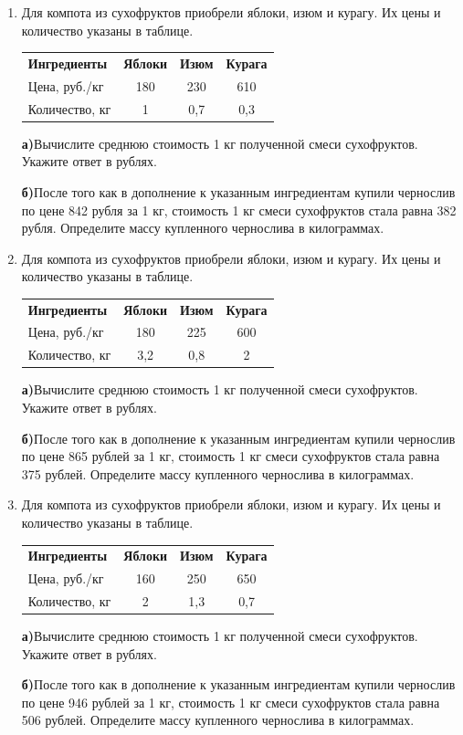 \documentclass[a4paper,12pt]{article}
\newcommand{\taskspace}{\par\vspace{0.42cm}}
\newcommand{\subtask}[2]{\par\medskip\textbf{#1}\enspace #2\par\vspace{0.22cm}}
\begin{document}
\begin{enumerate}[resume]
\taskspace

\item Для компота из сухофруктов приобрели яблоки, изюм и курагу. Их цены и количество указаны в таблице.
\begin{center}
\renewcommand{\arraystretch}{1.22}
\begin{tabular}{@{}lccc@{}}\textbf{Ингредиенты} & \textbf{Яблоки} & \textbf{Изюм} & \textbf{Курага} \\
Цена, руб./кг & 180 & 230 & 610 \\
Количество, кг & 1 & 0,7 & 0,3\end{tabular}
\end{center}
\subtask{а)}{Вычислите среднюю стоимость 1 кг полученной смеси сухофруктов. Укажите ответ в рублях.}
\subtask{б)}{После того как в дополнение к указанным ингредиентам купили чернослив по цене 842 рубля за 1 кг, стоимость 1 кг смеси сухофруктов стала равна 382 рубля. Определите массу купленного чернослива в килограммах.}

\taskspace

\item Для компота из сухофруктов приобрели яблоки, изюм и курагу. Их цены и количество указаны в таблице.
\begin{center}
\renewcommand{\arraystretch}{1.22}
\begin{tabular}{@{}lccc@{}}\textbf{Ингредиенты} & \textbf{Яблоки} & \textbf{Изюм} & \textbf{Курага} \\
Цена, руб./кг & 180 & 225 & 600 \\
Количество, кг & 3,2 & 0,8 & 2\end{tabular}
\end{center}
\subtask{а)}{Вычислите среднюю стоимость 1 кг полученной смеси сухофруктов. Укажите ответ в рублях.}
\subtask{б)}{После того как в дополнение к указанным ингредиентам купили чернослив по цене 865 рублей за 1 кг, стоимость 1 кг смеси сухофруктов стала равна 375 рублей. Определите массу купленного чернослива в килограммах.}

\taskspace

\item Для компота из сухофруктов приобрели яблоки, изюм и курагу. Их цены и количество указаны в таблице.
\begin{center}
\renewcommand{\arraystretch}{1.22}
\begin{tabular}{@{}lccc@{}}\textbf{Ингредиенты} & \textbf{Яблоки} & \textbf{Изюм} & \textbf{Курага} \\
Цена, руб./кг & 160 & 250 & 650 \\
Количество, кг & 2 & 1,3 & 0,7\end{tabular}
\end{center}
\subtask{а)}{Вычислите среднюю стоимость 1 кг полученной смеси сухофруктов. Укажите ответ в рублях.}
\subtask{б)}{После того как в дополнение к указанным ингредиентам купили чернослив по цене 946 рублей за 1 кг, стоимость 1 кг смеси сухофруктов стала равна 506 рублей. Определите массу купленного чернослива в килограммах.}


\end{enumerate}
\end{document}
